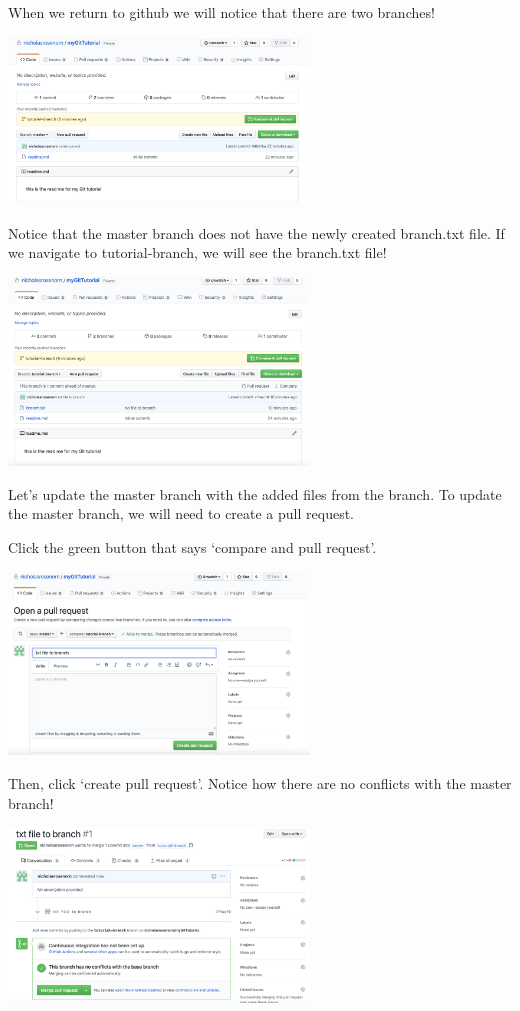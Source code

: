 \documentclass[]{book}
\begin{document}
When we return to github we will notice that there are two branches!

\includegraphics[width=0.60000\textwidth]{images/branch.png}

Notice that the master branch does not have the newly created branch.txt
file. If we navigate to tutorial-branch, we will see the branch.txt
file!

\includegraphics[width=0.60000\textwidth]{images/commit.png}

Let's update the master branch with the added files from the branch. To
update the master branch, we will need to create a pull request.

Click the green button that says `compare and pull request'.

\includegraphics[width=0.60000\textwidth]{images/pull.png}

Then, click `create pull request'. Notice how there are no conflicts
with the master branch!

\includegraphics[width=0.60000\textwidth]{images/merge.png}
\end{document}
